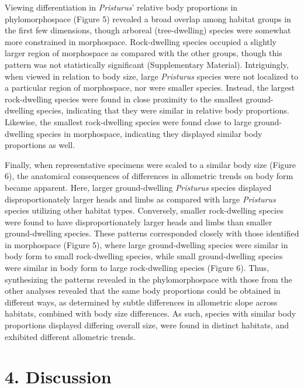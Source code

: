 \documentclass[
  11pt,
]{article}
\begin{document}
Viewing differentiation in \emph{Pristurus}' relative body proportions
in phylomorphospace (Figure 5) revealed a broad overlap among habitat
groups in the first few dimensions, though arboreal (tree-dwelling)
species were somewhat more constrained in morphospace. Rock-dwelling
species occupied a slightly larger region of morphospace as compared
with the other groups, though this pattern was not statistically
significant (Supplementary Material). Intriguingly, when viewed in
relation to body size, large \emph{Pristurus} species were not localized
to a particular region of morphospace, nor were smaller species.
Instead, the largest rock-dwelling species were found in close proximity
to the smallest ground-dwelling species, indicating that they were
similar in relative body proportions. Likewise, the smallest
rock-dwelling species were found close to large ground-dwelling species
in morphospace, indicating they displayed similar body proportions as
well. \hfill\break

Finally, when representative specimens were scaled to a similar body
size (Figure 6), the anatomical consequences of differences in
allometric trends on body form became apparent. Here, larger
ground-dwelling \emph{Pristurus} species displayed disproportionately
larger heads and limbs as compared with large \emph{Pristurus} species
utilizing other habitat types. Conversely, smaller rock-dwelling species
were found to have disproportionately larger heads and limbs than
smaller ground-dwelling species. These patterns corresponded closely
with those identified in morphospace (Figure 5), where large
ground-dwelling species were similar in body form to small rock-dwelling
species, while small ground-dwelling species were similar in body form
to large rock-dwelling species (Figure 6). Thus, synthesizing the
patterns revealed in the phylomorphospace with those from the other
analyses revealed that the same body proportions could be obtained in
different ways, as determined by subtle differences in allometric slope
across habitats, combined with body size differences. As such, species
with similar body proportions displayed differing overall size, were
found in distinct habitats, and exhibited different allometric trends.
\hfill\break

\hypertarget{discussion}{%
\section{4. Discussion}\label{discussion}}
\end{document}
